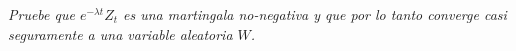 \emph{
    Pruebe que $e^{-\lambda t}Z_t$ es una martingala no-negativa y que por lo tanto 
    converge casi seguramente a una variable aleatoria $W$.\pn
}
\afterstatement\pn